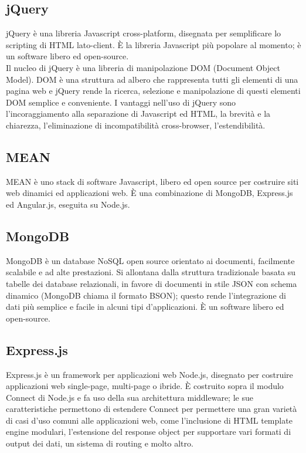 	\subsection{jQuery}{
		jQuery è una libreria Javascript cross-platform, disegnata per semplificare lo scripting di HTML lato-client. È la libreria Javascript più popolare al momento; è un software libero ed open-source. \\
		Il nucleo di jQuery è una libreria di manipolazione DOM (Document Object Model). DOM è una struttura ad albero che rappresenta tutti gli elementi di una pagina web e jQuery rende la ricerca, selezione e manipolazione di questi elementi DOM semplice e conveniente.
		I vantaggi nell'uso di jQuery sono l'incoraggiamento alla separazione di Javascript ed HTML, la brevità e la chiarezza, l'eliminazione di incompatibilità cross-browser, l'estendibilità.
	}
	\subsection{MEAN}{
		MEAN è uno stack di software Javascript, libero ed open source per costruire siti web dinamici ed applicazioni web. È una combinazione di MongoDB, Express.js ed Angular.js, eseguita su Node.js.
	}
	\subsection{MongoDB}{
		MongoDB è un database NoSQL open source orientato ai documenti, facilmente scalabile e ad alte prestazioni. Si allontana dalla struttura tradizionale basata su tabelle dei database relazionali, in favore di documenti in stile JSON con schema dinamico (MongoDB chiama il formato BSON); questo rende l'integrazione di dati più semplice e facile in alcuni tipi d'applicazioni. È un software libero ed open-source.
	}
	\subsection{Express.js}{
		Express.js è un framework per applicazioni web Node.js, disegnato per costruire applicazioni web single-page, multi-page o ibride.
		È costruito sopra il modulo Connect di Node.js e fa uso della sua architettura middleware; le sue caratteristiche permettono di estendere Connect per permettere una gran varietà di casi d'uso comuni alle applicazioni web, come l'inclusione di HTML template engine modulari, l'estensione del response object per supportare vari formati di output dei dati, un sistema di routing e molto altro.
	}
